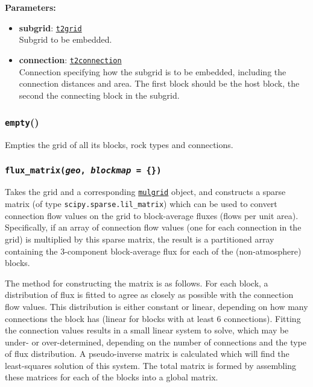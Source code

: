 \textbf{Parameters:}
\begin{itemize}
\item \textbf{subgrid}: \hyperref[t2grids]{\texttt{t2grid}}\\
  Subgrid to be embedded.
\item \textbf{connection}: \hyperref[t2connectionobjects]{\texttt{t2connection}}\\
  Connection specifying how the subgrid is to be embedded, including the connection distances and area.  The first block should be the host block, the second the connecting block in the subgrid.
\end{itemize}

\begin{snugshade}
\subsubsection{\texttt{empty}()}
\end{snugshade}
\label{sec:t2grid:empty}

Empties the grid of all its blocks, rock types and connections.

\begin{snugshade}
\subsubsection{\texttt{flux\_matrix(\emph{geo}, \emph{blockmap} = \{\})}}
\end{snugshade}
\label{sec:t2grid:flux_matrix}

Takes the grid and a corresponding \hyperref[mulgrids]{\texttt{mulgrid}} object, and constructs a sparse matrix (of type \texttt{scipy.sparse.lil\_matrix}) which can be used to convert connection flow values on the grid to block-average fluxes (flows per unit area).  Specifically, if an array of connection flow values (one for each connection in the grid) is multiplied by this sparse matrix, the result is a partitioned array containing the 3-component block-average flux for each of the (non-atmosphere) blocks.

The method for constructing the matrix is as follows.  For each block, a distribution of flux is fitted to agree as closely as possible with the connection flow values.  This distribution is either constant or linear, depending on how many connections the block has (linear for blocks with at least 6 connections).  Fitting the connection values results in a small linear system to solve, which may be under- or over-determined, depending on the number of connections and the type of flux distribution.  A pseudo-inverse matrix is calculated which will find the least-squares solution of this system.  The total matrix is formed by assembling these matrices for each of the blocks into a global matrix.

